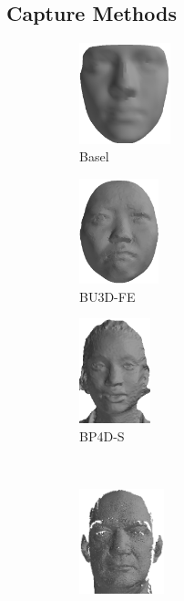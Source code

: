 \subsection{Capture Methods}\label{subsec:bg_capture}
\begin{figure}[ht]
	\centering
	\begin{subfigure}[b]{0.3\textwidth}
		\centering
		\includegraphics[height=1.15in]{background/images/basel}
		\caption{Basel~\cite{paysan20093d}}\label{fig:db_examples_basel}
	\end{subfigure}
	\begin{subfigure}[b]{0.3\textwidth}
		\centering
		\includegraphics[height=1.2in]{background/images/bu3d}
		\caption{BU3D-FE~\cite{Yin:2006cc}}\label{fig:db_examples_bu3d}
	\end{subfigure}
	\begin{subfigure}[b]{0.3\textwidth}
		\centering
		\includegraphics[height=1.2in]{background/images/bp4d}
		\caption{BP4D-S~\cite{Zhang:2014id}}\label{fig:db_examples_bp4d}
	\end{subfigure} \\
	\begin{subfigure}[b]{0.3\textwidth}
		\centering
		\includegraphics[height=1.2in]{background/images/frgc}

\end{subfigure}
\end{figure}
